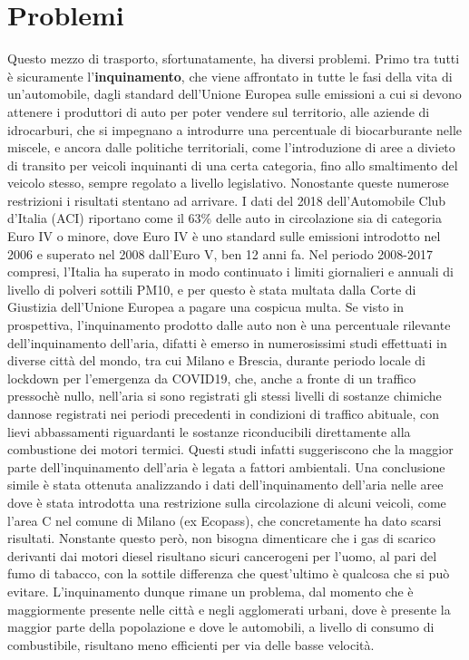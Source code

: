 
\section{Problemi}

Questo mezzo di trasporto, sfortunatamente, ha diversi problemi. Primo tra tutti è sicuramente l'\textbf{inquinamento}, che viene affrontato in tutte le fasi della vita di un'automobile, dagli standard dell'Unione Europea sulle emissioni a cui si devono attenere i produttori di auto per poter vendere sul territorio, alle aziende di idrocarburi, che si impegnano a introdurre una percentuale di biocarburante nelle miscele, e ancora dalle politiche territoriali, come l'introduzione di aree a divieto di transito per veicoli inquinanti di una certa categoria, fino allo smaltimento del veicolo stesso, sempre regolato a livello legislativo. Nonostante queste numerose restrizioni i risultati stentano ad arrivare. I dati del 2018 dell'Automobile Club d'Italia (ACI) riportano come il 63\% delle auto in circolazione sia di categoria Euro IV o minore\cite{anfiastudiestatistiche}, dove Euro IV è uno standard sulle emissioni introdotto nel 2006 e superato nel 2008 dall'Euro V, ben 12 anni fa\cite{euroivstandard}. Nel periodo 2008-2017 compresi, l'Italia ha superato in modo continuato i limiti giornalieri e annuali di livello di polveri sottili PM10, e per questo è stata multata dalla Corte di Giustizia dell'Unione Europea a pagare una cospicua multa\cite{eunewssanzioneitalia}. Se visto in prospettiva, l'inquinamento prodotto dalle auto non è una percentuale rilevante dell'inquinamento dell'aria, difatti è emerso in numerosissimi studi effettuati in diverse città del mondo, tra cui Milano e Brescia\cite{collivignarelli2020}\cite{camaletti2020}, durante periodo locale di lockdown per l'emergenza da COVID19, che, anche a fronte di un traffico pressochè nullo, nell'aria si sono registrati gli stessi livelli di sostanze chimiche dannose registrati nei periodi precedenti in condizioni di traffico abituale, con lievi abbassamenti riguardanti le sostanze riconducibili direttamente alla combustione dei motori termici. Questi studi infatti suggeriscono che la maggior parte dell'inquinamento dell'aria è legata a fattori ambientali. Una conclusione simile è stata ottenuta analizzando i dati dell'inquinamento dell'aria nelle aree dove è stata introdotta una restrizione sulla circolazione di alcuni veicoli, come l'area C nel comune di Milano (ex Ecopass), che concretamente ha dato scarsi risultati\cite{trentini2014}. Nonstante questo però, non bisogna dimenticare che i gas di scarico derivanti dai motori diesel risultano sicuri cancerogeni per l'uomo, al pari del fumo di tabacco, con la sottile differenza che quest'ultimo è qualcosa che si può evitare\cite{iarctable}. L'inquinamento dunque rimane un problema, dal momento che è maggiormente presente nelle città e negli agglomerati urbani, dove è presente la maggior parte della popolazione e dove le automobili, a livello di consumo di combustibile, risultano meno efficienti per via delle basse velocità.

